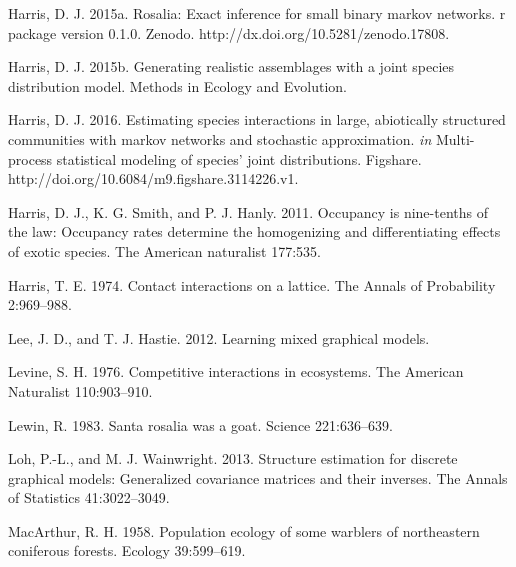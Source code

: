 \documentclass[12pt,]{article}
\begin{document}
\begin{spacing}{1.9}
\begin{flushleft}
Harris, D. J. 2015a. Rosalia: Exact inference for small binary markov
networks. r package version 0.1.0. Zenodo.
http://dx.doi.org/10.5281/zenodo.17808.

Harris, D. J. 2015b. Generating realistic assemblages with a joint
species distribution model. Methods in Ecology and Evolution.

Harris, D. J. 2016. Estimating species interactions in large,
abiotically structured communities with markov networks and stochastic
approximation. \emph{in} Multi-process statistical modeling of species'
joint distributions. Figshare.
http://doi.org/10.6084/m9.figshare.3114226.v1.

Harris, D. J., K. G. Smith, and P. J. Hanly. 2011. Occupancy is
nine-tenths of the law: Occupancy rates determine the homogenizing and
differentiating effects of exotic species. The American naturalist
177:535.

Harris, T. E. 1974. Contact interactions on a lattice. The Annals of
Probability 2:969--988.

Lee, J. D., and T. J. Hastie. 2012. Learning mixed graphical models.

Levine, S. H. 1976. Competitive interactions in ecosystems. The American
Naturalist 110:903--910.

Lewin, R. 1983. Santa rosalia was a goat. Science 221:636--639.

Loh, P.-L., and M. J. Wainwright. 2013. Structure estimation for
discrete graphical models: Generalized covariance matrices and their
inverses. The Annals of Statistics 41:3022--3049.

MacArthur, R. H. 1958. Population ecology of some warblers of
northeastern coniferous forests. Ecology 39:599--619.


\end{flushleft}
\end{spacing}
\end{document}
